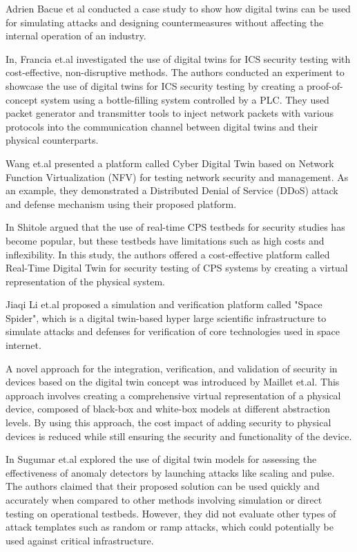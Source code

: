 Adrien Bacue et al \cite{adrienbacueDigitalTwinsEnhanced2022} conducted a case study to show how digital twins can be used for simulating attacks and designing countermeasures without affecting the internal operation of an industry.  

In\cite{franciaDigitalTwinsIndustrial2021}, Francia et.al investigated the use of digital twins for ICS security testing with cost-effective, non-disruptive methods. The authors conducted an experiment to showcase the use of digital twins for ICS security testing by creating a proof-of-concept system using a bottle-filling system controlled by a PLC. They used packet generator and transmitter tools to inject network packets with various protocols into the communication channel between digital twins and their physical counterparts.  

Wang et.al \cite{wangDTCPNDigitalTwin2022} presented a platform called Cyber Digital Twin based on Network Function Virtualization (NFV) for testing network security and management. As an example, they demonstrated a Distributed Denial of Service (DDoS) attack and defense mechanism using their proposed platform.  

In \cite{shitoleRealTimeDigitalTwin2021} Shitole argued that the use of real-time CPS testbeds for security studies has become popular, but these testbeds have limitations such as high costs and inflexibility. In this study, the authors offered a cost-effective platform called Real-Time Digital Twin for security testing of CPS systems by creating a virtual representation of the physical system.  

Jiaqi Li et.al \cite{jiaqiliSpaceSpiderHyper2022} proposed a simulation and verification platform called "Space Spider", which is a digital twin-based hyper large scientific infrastructure to simulate attacks and defenses for verification of core technologies used in space internet.  

A novel approach for the integration, verification, and validation of security in devices based on the digital twin concept was introduced by Maillet et.al\cite{maillet-contozEndtoendSecurityValidation2020}. This approach involves creating a comprehensive virtual representation of a physical device, composed of black-box and white-box models at different abstraction levels. By using this approach, the cost impact of adding security to physical devices is reduced while still ensuring the security and functionality of the device.  

In \cite{sugumarAssessmentMethodDetecting2019} Sugumar et.al explored the use of digital twin models for assessing the effectiveness of anomaly detectors by launching attacks like scaling and pulse. The authors claimed that their proposed solution can be used quickly and accurately when compared to other methods involving simulation or direct testing on operational testbeds. However, they did not evaluate other types of attack templates such as random or ramp attacks, which could potentially be used against critical infrastructure.  

